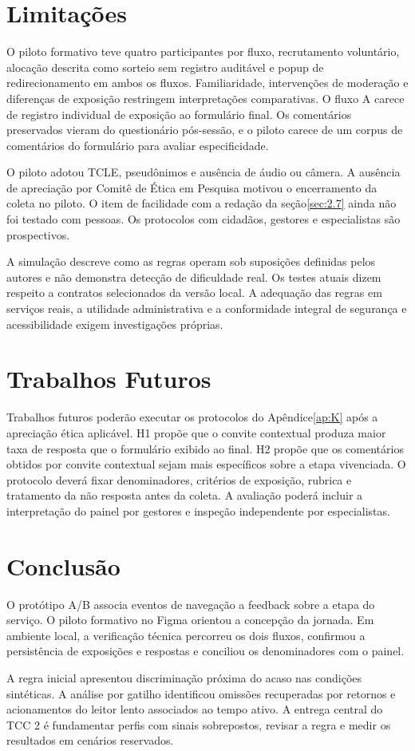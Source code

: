 \section{Limitações}
\label{sec:5.2}

O piloto formativo teve quatro participantes por fluxo, recrutamento voluntário, alocação descrita como sorteio sem registro auditável e popup de redirecionamento em ambos os fluxos. Familiaridade, intervenções de moderação e diferenças de exposição restringem interpretações comparativas. O fluxo A carece de registro individual de exposição ao formulário final. Os comentários preservados vieram do questionário pós-sessão, e o piloto carece de um corpus de comentários do formulário para avaliar especificidade.

O piloto adotou TCLE, pseudônimos e ausência de áudio ou câmera. A ausência de apreciação por Comitê de Ética em Pesquisa motivou o encerramento da coleta no piloto. O item de facilidade com a redação da seção\nobreakspace{}\ref{sec:2.7} ainda não foi testado com pessoas. Os protocolos com cidadãos, gestores e especialistas são prospectivos.

A simulação descreve como as regras operam sob suposições definidas pelos autores e não demonstra detecção de dificuldade real. Os testes atuais dizem respeito a contratos selecionados da versão local. A adequação das regras em serviços reais, a utilidade administrativa e a conformidade integral de segurança e acessibilidade exigem investigações próprias.

\section{Trabalhos Futuros}
\label{sec:5.3}

Trabalhos futuros poderão executar os protocolos do Apêndice\nobreakspace{}\ref{ap:K} após a apreciação ética aplicável. H1 propõe que o convite contextual produza maior taxa de resposta que o formulário exibido ao final. H2 propõe que os comentários obtidos por convite contextual sejam mais específicos sobre a etapa vivenciada. O protocolo deverá fixar denominadores, critérios de exposição, rubrica e tratamento da não resposta antes da coleta. A avaliação poderá incluir a interpretação do painel por gestores e inspeção independente por especialistas.

\section{Conclusão}
\label{sec:5.4}

O protótipo A/B associa eventos de navegação a feedback sobre a etapa do serviço. O piloto formativo no Figma orientou a concepção da jornada. Em ambiente local, a verificação técnica percorreu os dois fluxos, confirmou a persistência de exposições e respostas e conciliou os denominadores com o painel.

A regra inicial apresentou discriminação próxima do acaso nas condições sintéticas. A análise por gatilho identificou omissões recuperadas por retornos e acionamentos do leitor lento associados ao tempo ativo. A entrega central do TCC 2 é fundamentar perfis com sinais sobrepostos, revisar a regra e medir os resultados em cenários reservados.

